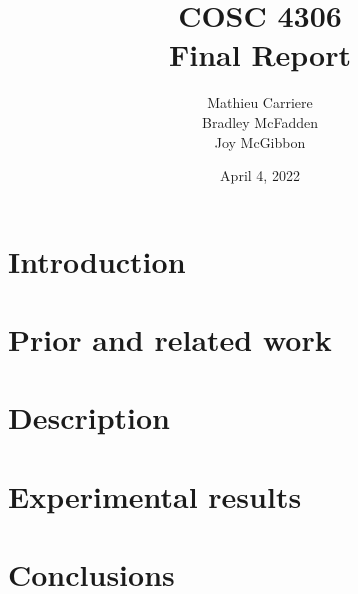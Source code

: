 \documentclass[12pt]{report}
\title{ \Large COSC 4306 \\ \textbf{Final Report} }
\author{Mathieu Carriere\\Bradley McFadden\\Joy McGibbon}
\date{April 4, 2022}
\begin{document}
\maketitle



\section{Introduction} 

\section{Prior and related work} 

\section{Description} 

\section{Experimental results} 

\section{Conclusions} 


\end{document}
